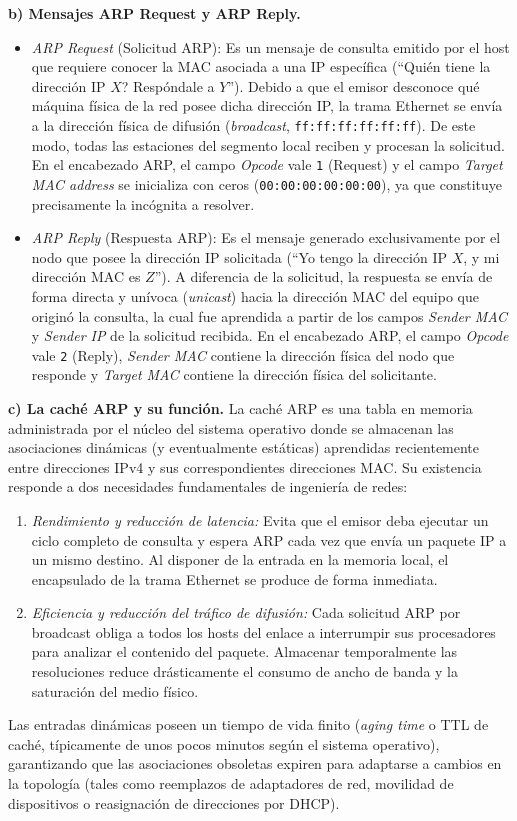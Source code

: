 \documentclass[12pt,a4paper]{article}
\begin{document}
\textbf{b) Mensajes ARP Request y ARP Reply.}
\begin{itemize}
    \item \emph{ARP Request} (Solicitud ARP): Es un mensaje de consulta emitido por el host que requiere conocer la MAC asociada a una IP específica (``\textquestiondown Quién tiene la dirección IP $X$? Respóndale a $Y$''). Debido a que el emisor desconoce qué máquina física de la red posee dicha dirección IP, la trama Ethernet se envía a la dirección física de difusión (\emph{broadcast}, \texttt{ff:ff:ff:ff:ff:ff}). De este modo, todas las estaciones del segmento local reciben y procesan la solicitud. En el encabezado ARP, el campo \emph{Opcode} vale \texttt{1} (Request) y el campo \emph{Target MAC address} se inicializa con ceros (\texttt{00:00:00:00:00:00}), ya que constituye precisamente la incógnita a resolver.
    \item \emph{ARP Reply} (Respuesta ARP): Es el mensaje generado exclusivamente por el nodo que posee la dirección IP solicitada (``Yo tengo la dirección IP $X$, y mi dirección MAC es $Z$''). A diferencia de la solicitud, la respuesta se envía de forma directa y unívoca (\emph{unicast}) hacia la dirección MAC del equipo que originó la consulta, la cual fue aprendida a partir de los campos \emph{Sender MAC} y \emph{Sender IP} de la solicitud recibida. En el encabezado ARP, el campo \emph{Opcode} vale \texttt{2} (Reply), \emph{Sender MAC} contiene la dirección física del nodo que responde y \emph{Target MAC} contiene la dirección física del solicitante.
\end{itemize}

\textbf{c) La caché ARP y su función.}
La caché ARP es una tabla en memoria administrada por el núcleo del sistema operativo donde se almacenan las asociaciones dinámicas (y eventualmente estáticas) aprendidas recientemente entre direcciones IPv4 y sus correspondientes direcciones MAC. Su existencia responde a dos necesidades fundamentales de ingeniería de redes:
\begin{enumerate}
    \item \emph{Rendimiento y reducción de latencia:} Evita que el emisor deba ejecutar un ciclo completo de consulta y espera ARP cada vez que envía un paquete IP a un mismo destino. Al disponer de la entrada en la memoria local, el encapsulado de la trama Ethernet se produce de forma inmediata.
    \item \emph{Eficiencia y reducción del tráfico de difusión:} Cada solicitud ARP por broadcast obliga a todos los hosts del enlace a interrumpir sus procesadores para analizar el contenido del paquete. Almacenar temporalmente las resoluciones reduce drásticamente el consumo de ancho de banda y la saturación del medio físico.
\end{enumerate}
Las entradas dinámicas poseen un tiempo de vida finito (\emph{aging time} o TTL de caché, típicamente de unos pocos minutos según el sistema operativo), garantizando que las asociaciones obsoletas expiren para adaptarse a cambios en la topología (tales como reemplazos de adaptadores de red, movilidad de dispositivos o reasignación de direcciones por DHCP).
\end{document}
